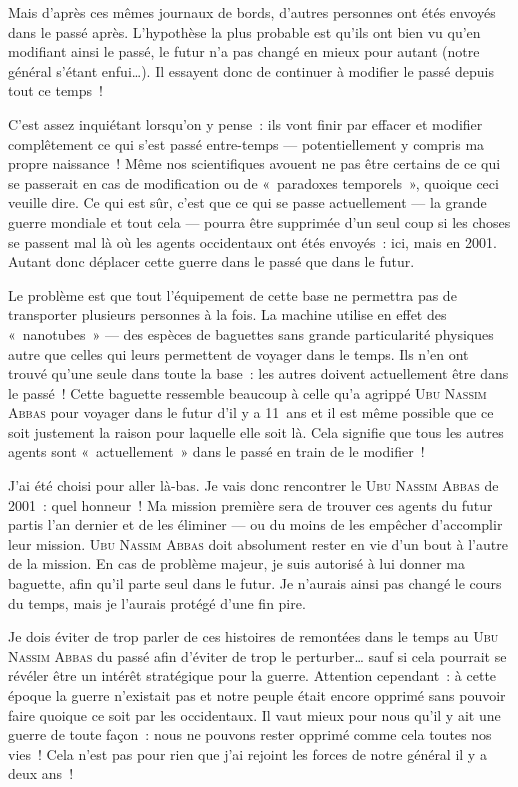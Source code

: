 {	Mais d’après ces mêmes journaux de bords, d’autres personnes ont étés envoyés dans le passé après.  L’hypothèse la plus probable est qu’ils ont bien vu qu’en modifiant ainsi le passé, le futur n’a pas changé en mieux pour autant (notre général s’étant enfui…).  Il essayent donc de continuer à modifier le passé depuis tout ce temps~!

	C’est assez inquiétant lorsqu’on y pense~:  ils vont finir par effacer et modifier complêtement ce qui s’est passé entre-temps — potentiellement y compris ma propre naissance~!
	Même nos scientifiques avouent ne pas être certains de ce qui se passerait en cas de modification ou de «~paradoxes temporels~», quoique ceci veuille dire.
	Ce qui est sûr, c’est que ce qui se passe actuellement — la grande guerre mondiale et tout cela — pourra être supprimée d’un seul coup si les choses se passent mal là où les agents occidentaux ont étés envoyés~:  ici, mais en 2001.
	Autant donc déplacer cette guerre dans le passé que dans le futur.

	Le problème est que tout l’équipement de cette base ne permettra pas de transporter plusieurs personnes à la fois.  La machine utilise en effet des «~nanotubes~» — des espèces de baguettes sans grande particularité physiques autre que celles qui leurs permettent de voyager dans le temps.
	Ils n’en ont trouvé qu’une seule dans toute la base~:  les autres doivent actuellement être dans le passé~!
	Cette baguette ressemble beaucoup à celle qu’a agrippé \textsc{Ubu Nassim Abbas} pour voyager dans le futur d’il y a 11~ans et il est même possible que ce soit justement la raison pour laquelle elle soit là.
	Cela signifie que tous les autres agents sont «~actuellement~» dans le passé en train de le modifier~!

	J’ai été choisi pour aller là-bas.  Je vais donc rencontrer le \textsc{Ubu Nassim Abbas} de 2001~:  quel honneur~!
	Ma mission première sera de trouver ces agents du futur partis l’an dernier et de les éliminer — ou du moins de les empêcher d’accomplir leur mission.
	\textsc{Ubu Nassim Abbas} doit absolument rester en vie d’un bout à l’autre de la mission.
	En cas de problème majeur, je suis autorisé à lui donner ma baguette, afin qu’il parte seul dans le futur.  Je n’aurais ainsi pas changé le cours du temps, mais je l’aurais protégé d’une fin pire.

	Je dois éviter de trop parler de ces histoires de remontées dans le temps au \textsc{Ubu Nassim Abbas} du passé afin d’éviter de trop le perturber… sauf si cela pourrait se révéler être un intérêt stratégique pour la guerre.
	Attention cependant~:  à cette époque la guerre n’existait pas et notre peuple était encore opprimé sans pouvoir faire quoique ce soit par les occidentaux.
	Il vaut mieux pour nous qu’il y ait une guerre de toute façon~:  nous ne pouvons rester opprimé comme cela toutes nos vies~!  Cela n’est pas pour rien que j’ai rejoint les forces de notre général il y a deux ans~!

}
